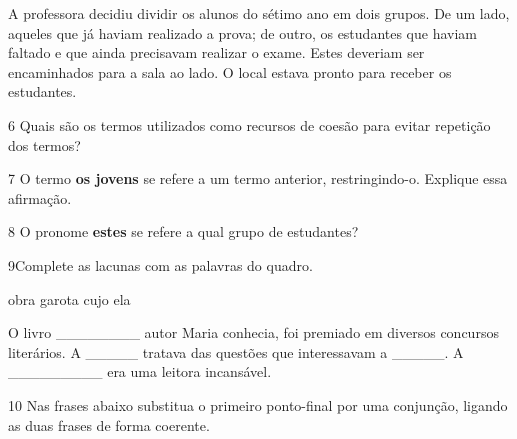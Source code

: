 \begin{myquote}

A professora decidiu dividir os alunos do sétimo ano em dois grupos. De um
lado, aqueles que já haviam realizado a prova; de outro, os estudantes que
haviam faltado e que ainda precisavam realizar o exame. Estes deveriam
ser encaminhados para a sala ao lado. O local estava pronto para receber
os estudantes.

\end{myquote}

\num{6} Quais são os termos utilizados como recursos de coesão para
evitar repetição dos termos? 


\num{7} O termo \textbf{os jovens} se refere a um termo anterior, restringindo-o. 
Explique essa afirmação.


\num{8} O pronome \textbf{estes} se refere a qual grupo de estudantes?


\num{9}Complete as lacunas com as palavras do quadro.

\begin{myquote}

obra garota cujo  ela

\end{myquote}

O livro \_\_\_\_\_\_\_\_ autor Maria conhecia, foi premiado em diversos
concursos literários. A \_\_\_\_\_ tratava das questões que interessavam
a \_\_\_\_\_. A \_\_\_\_\_\_\_\_\_ era uma leitora incansável.


\num{10} Nas frases abaixo substitua o primeiro ponto-final por uma conjunção,
ligando as duas frases de forma coerente. 

